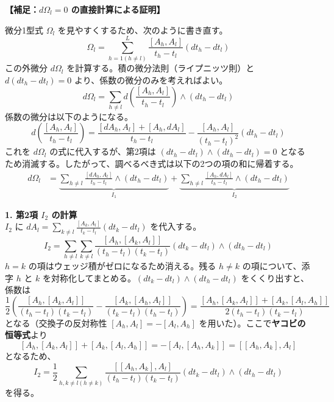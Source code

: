 \vspace{1em}
\noindent
\textbf{【補足：$d\Omega_l = 0$ の直接計算による証明】}

微分1型式 $\Omega_l$ を見やすくするため、次のように書き直す。
\[
  \Omega_l = \sum_{h=1 (h \neq l)}^L \frac{[A_h, A_l]}{t_h - t_l} (dt_h - dt_l)
\]
この外微分 $d\Omega_l$ を計算する。積の微分法則（ライプニッツ則）と $d(dt_h - dt_l) = 0$ より、係数の微分のみを考えればよい。
\[
  d\Omega_l = \sum_{h \neq l} d\left( \frac{[A_h, A_l]}{t_h - t_l} \right) \wedge (dt_h - dt_l)
\]
係数の微分は以下のようになる。
\[
  d\left( \frac{[A_h, A_l]}{t_h - t_l} \right) = \frac{[dA_h, A_l] + [A_h, dA_l]}{t_h - t_l} - \frac{[A_h, A_l]}{(t_h - t_l)^2}(dt_h - dt_l)
\]
これを $d\Omega_l$ の式に代入するが、第2項は $(dt_h - dt_l) \wedge (dt_h - dt_l) = 0$ となるため消滅する。したがって、調べるべき式は以下の2つの項の和に帰着する。
\begin{align*}
  d\Omega_l &= \underbrace{ \sum_{h \neq l} \frac{[dA_h, A_l]}{t_h - t_l} \wedge (dt_h - dt_l) }_{I_1} + \underbrace{ \sum_{h \neq l} \frac{[A_h, dA_l]}{t_h - t_l} \wedge (dt_h - dt_l) }_{I_2}
\end{align*}

\textbf{1. 第2項 $I_2$ の計算} \\
$I_2$ に $dA_l = \sum_{k \neq l} \frac{[A_k, A_l]}{t_k - t_l}(dt_k - dt_l)$ を代入する。
\[
  I_2 = \sum_{h \neq l} \sum_{k \neq l} \frac{[A_h, [A_k, A_l]]}{(t_h - t_l)(t_k - t_l)} (dt_k - dt_l) \wedge (dt_h - dt_l)
\]
$h=k$ の項はウェッジ積がゼロになるため消える。残る $h \neq k$ の項について、添字 $h$ と $k$ を対称化してまとめる。$(dt_k - dt_l) \wedge (dt_h - dt_l)$ をくくり出すと、係数は
\[
  \frac{1}{2} \left( \frac{[A_h, [A_k, A_l]]}{(t_h - t_l)(t_k - t_l)} - \frac{[A_k, [A_h, A_l]]}{(t_k - t_l)(t_h - t_l)} \right) = \frac{ [A_h, [A_k, A_l]] + [A_k, [A_l, A_h]] }{2(t_h - t_l)(t_k - t_l)}
\]
となる（交換子の反対称性 $[A_h, A_l] = -[A_l, A_h]$ を用いた）。ここで\textbf{ヤコビの恒等式}より
\[
  [A_h, [A_k, A_l]] + [A_k, [A_l, A_h]] = -[A_l, [A_h, A_k]] = [[A_h, A_k], A_l]
\]
となるため、
\begin{equation}
  I_2 = \frac{1}{2} \sum_{h, k \neq l (h \neq k)} \frac{[[A_h, A_k], A_l]}{(t_h - t_l)(t_k - t_l)} (dt_k - dt_l) \wedge (dt_h - dt_l)
  \label{eq:3.4_I2_result}
\end{equation}
を得る。

